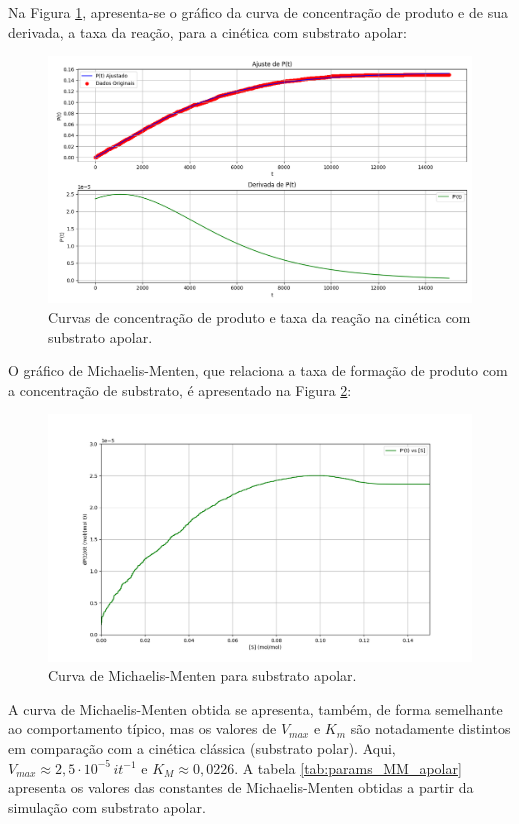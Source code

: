 \documentclass[12pt,oneside]{report}
\begin{document}
Na Figura \ref{fig:MM_apolar_rate}, apresenta-se o gráfico da curva de concentração de produto e de sua derivada, a taxa da reação, para a cinética com substrato apolar:

\begin{figure}[H]
    \centering
    \includegraphics[width=1\textwidth]{img/MM_apolar_rate.png}
    \caption{\small Curvas de concentração de produto e taxa da reação na cinética com substrato apolar.}
    \label{fig:MM_apolar_rate}
\end{figure}

O gráfico de Michaelis-Menten, que relaciona a taxa de formação de produto com a concentração de substrato, é apresentado na Figura \ref{fig:MM_apolar_curve}:

\begin{figure}[H]
    \centering
    \includegraphics[width=1\textwidth]{img/MM_apolar_curve.png}
    \caption{\small Curva de Michaelis-Menten para substrato apolar.}
    \label{fig:MM_apolar_curve}
\end{figure}

A curva de Michaelis-Menten obtida se apresenta, também, de forma semelhante ao comportamento típico, mas os valores de $V_{max}$ e $K_m$ são notadamente distintos em comparação com a cinética clássica (substrato polar). Aqui, $V_{max} \approx 2{,}5 \cdot 10^{-5} \, it^{-1}$ e $K_M \approx 0{,}0226$. A tabela \ref{tab:params_MM_apolar} apresenta os valores das constantes de Michaelis-Menten obtidas a partir da simulação com substrato apolar.
\end{document}

